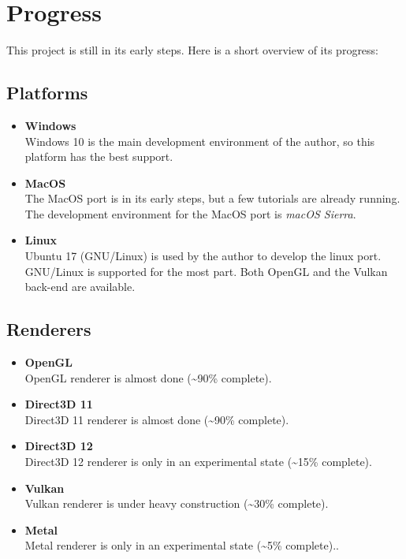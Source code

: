 \documentclass{article}
\begin{document}
\newpage
\section{Progress}

This project is still in its early steps. Here is a short overview of its progress:

\subsection{Platforms}
\begin{itemize}
	\item \textbf{Windows} \\
	Windows 10 is the main development environment of the author, so this platform has the best support.
	
	\item \textbf{MacOS} \\
	The MacOS port is in its early steps, but a few tutorials are already running.
	The development environment for the MacOS port is \emph{macOS Sierra}.
	
	\item \textbf{Linux} \\
	Ubuntu 17 (GNU/Linux) is used by the author to develop the linux port. GNU/Linux is supported for the most part.
	Both OpenGL and the Vulkan back-end are available.
\end{itemize}
	
\subsection{Renderers}
\begin{itemize}
	\item \textbf{OpenGL} \\
	OpenGL renderer is almost done (\textasciitilde 90\% complete).
	
	\item \textbf{Direct3D 11} \\
	Direct3D 11 renderer is almost done (\textasciitilde 90\% complete).
	
	\item \textbf{Direct3D 12} \\
	Direct3D 12 renderer is only in an experimental state (\textasciitilde 15\% complete).
	
	\item \textbf{Vulkan} \\
	Vulkan renderer is under heavy construction (\textasciitilde 30\% complete).
	
	\item \textbf{Metal} \\
	Metal renderer is only in an experimental state (\textasciitilde 5\% complete)..
\end{itemize}
\end{document}
